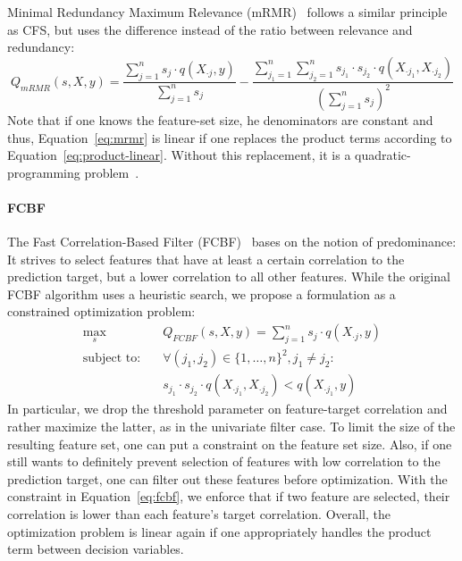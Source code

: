 \documentclass{article}
\theoremstyle{definition}
\begin{document}
Minimal Redundancy Maximum Relevance (mRMR)~\cite{peng2005feature} follows a similar principle as CFS, but uses the difference instead of the ratio between relevance and redundancy:
%
\begin{equation}
	Q_{mRMR}(s,X,y) = \frac{\sum_{j=1}^{n} s_j \cdot q(X_{\cdot{}j},y)}{\sum_{j=1}^{n} s_j} - \frac{\sum_{j_1=1}^{n} \sum_{j_2=1}^{n} s_{j_1} \cdot s_{j_2} \cdot q(X_{\cdot{}j_1}, X_{\cdot{}j_2})}{(\sum_{j=1}^{n} s_j)^2}
	\label{eq:mrmr}
\end{equation}
%
Note that if one knows the feature-set size, he denominators are constant and thus, Equation~\ref{eq:mrmr} is linear if one replaces the product terms according to Equation~\ref{eq:product-linear}.
Without this replacement, it is a quadratic-programming problem~\cite{rodriguez2010quadratic, nguyen2014effective}.

\paragraph{FCBF}

The Fast Correlation-Based Filter (FCBF)~\cite{yu2003feature} bases on the notion of predominance:
It strives to select features that have at least a certain correlation to the prediction target, but a lower correlation to all other features.
While the original FCBF algorithm uses a heuristic search, we propose a formulation as a constrained optimization problem:
%
\begin{align}
	\max_s &\quad Q_{FCBF}(s,X,y) = \sum_{j=1}^{n} s_j \cdot q(X_{\cdot{}j},y) \nonumber \\
	\text{subject to:} &\quad \forall (j_1,j_2) \in \{1, \dots, n\}^2, j_1 \neq j_2: \nonumber \\
	&\quad s_{j_1} \cdot s_{j_2} \cdot q(X_{\cdot{}j_1}, X_{\cdot{}j_2}) < q(X_{\cdot{}j_1},y)
	\label{eq:fcbf}
\end{align}
%
In particular, we drop the threshold parameter on feature-target correlation and rather maximize the latter, as in the univariate filter case.
To limit the size of the resulting feature set, one can put a constraint on the feature set size.
Also, if one still wants to definitely prevent selection of features with low correlation to the prediction target, one can filter out these features before optimization.
With the constraint in Equation~\ref{eq:fcbf}, we enforce that if two feature are selected, their correlation is lower than each feature's target correlation.
Overall, the optimization problem is linear again if one appropriately handles the product term between decision variables.
\end{document}

